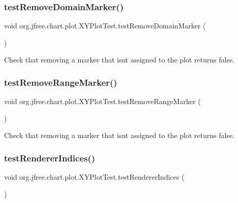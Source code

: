\subsubsection{\texorpdfstring{test\+Remove\+Domain\+Marker()}{testRemoveDomainMarker()}}
{\footnotesize\ttfamily void org.\+jfree.\+chart.\+plot.\+X\+Y\+Plot\+Test.\+test\+Remove\+Domain\+Marker (\begin{DoxyParamCaption}{ }\end{DoxyParamCaption})}

Check that removing a marker that isn\textquotesingle{}t assigned to the plot returns false. \mbox{\label{classorg_1_1jfree_1_1chart_1_1plot_1_1_x_y_plot_test_a650ddff3501f24a6877a168e3765ebf7}} 
\subsubsection{\texorpdfstring{test\+Remove\+Range\+Marker()}{testRemoveRangeMarker()}}
{\footnotesize\ttfamily void org.\+jfree.\+chart.\+plot.\+X\+Y\+Plot\+Test.\+test\+Remove\+Range\+Marker (\begin{DoxyParamCaption}{ }\end{DoxyParamCaption})}

Check that removing a marker that isn\textquotesingle{}t assigned to the plot returns false. \mbox{\label{classorg_1_1jfree_1_1chart_1_1plot_1_1_x_y_plot_test_aecaf8af7f7fda37d58e9f6d864093e2c}} 
\subsubsection{\texorpdfstring{test\+Renderer\+Indices()}{testRendererIndices()}}
{\footnotesize\ttfamily void org.\+jfree.\+chart.\+plot.\+X\+Y\+Plot\+Test.\+test\+Renderer\+Indices (\begin{DoxyParamCaption}{ }\end{DoxyParamCaption})}

